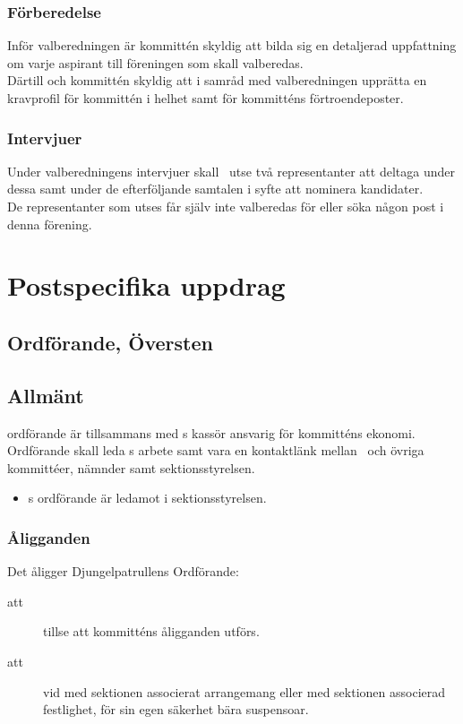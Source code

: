 \subsubsection{Förberedelse}
Inför valberedningen är kommittén skyldig att bilda sig en detaljerad uppfattning om varje aspirant till föreningen som skall valberedas.\\
Därtill och kommittén skyldig att i samråd med valberedningen upprätta en kravprofil för kommittén i helhet samt för kommitténs förtroendeposter.

\subsubsection{Intervjuer}
Under valberedningens intervjuer skall \forening \ utse två representanter att deltaga under dessa samt under de efterföljande samtalen i syfte att nominera kandidater.\\
De representanter som utses får själv inte valberedas för eller söka någon post i denna förening.

\section{Postspecifika uppdrag}

\subsection{Ordförande, Översten}
\subsection{Allmänt}
\forenings ordförande är tillsammans med \forening s kassör ansvarig för kommitténs ekonomi. Ordförande skall leda \forening s arbete samt vara en kontaktlänk mellan \forening \ och övriga kommittéer, nämnder samt sektionsstyrelsen. 
\begin{itemize}
\item \forening s ordförande är ledamot i sektionsstyrelsen.

\end{itemize}

\subsubsection{Åligganden}
Det åligger Djungelpatrullens Ordförande:
\begin{description}
\item[att] tillse att kommitténs åligganden utförs.

\item[att] vid med sektionen associerat arrangemang eller med sektionen associerad festlighet, för sin egen säkerhet bära suspensoar. 

\end{description}

